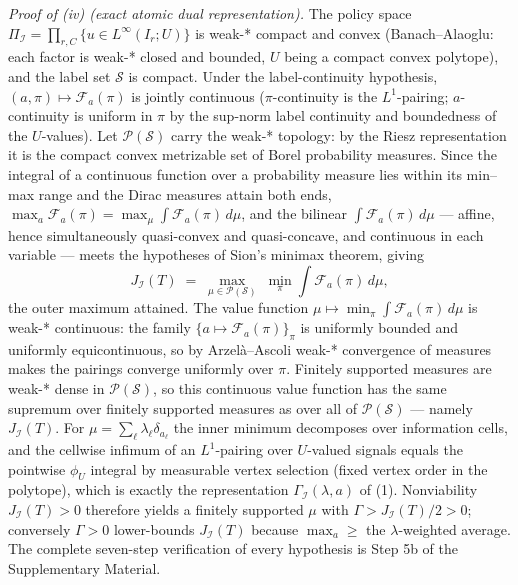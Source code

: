 \documentclass[10pt,twocolumn]{article}
\theoremstyle{plain}
\theoremstyle{definition}
\theoremstyle{remark}
\begin{document}
\emph{Proof of (iv) (exact atomic dual representation).} The policy space
\(\Pi_{\mathcal{I}} = \prod_{r,C}\{u \in L^\infty(I_r; U)\}\) is
weak-* compact and convex (Banach--Alaoglu: each factor is weak-* closed
and bounded, \(U\) being a compact convex polytope), and the label set
\(\mathscr{S}\) is compact. Under the label-continuity hypothesis,
\((a, \pi) \mapsto \mathcal{F}_a(\pi)\) is jointly continuous
(\(\pi\)-continuity is the \(L^1\)-pairing; \(a\)-continuity is
uniform in \(\pi\) by the sup-norm label continuity and boundedness of
the \(U\)-values). Let \(\mathcal{P}(\mathscr{S})\) carry the weak-*
topology: by the Riesz representation it is the compact convex metrizable
set of Borel probability measures. Since the integral of a continuous
function over a probability measure lies within its min--max range and
the Dirac measures attain both ends,
\(\max_a \mathcal{F}_a(\pi) = \max_\mu \int
\mathcal{F}_a(\pi)\,d\mu\), and the bilinear
\(\int \mathcal{F}_a(\pi)\,d\mu\) --- affine, hence simultaneously
quasi-convex and quasi-concave, and continuous in each variable --- meets
the hypotheses of Sion's minimax theorem, giving
\[
J_{\mathcal{I}}(T) \;=\; \max_{\mu \in \mathcal{P}(\mathscr{S})}
\; \min_{\pi} \int \mathcal{F}_a(\pi)\,d\mu,
\]
the outer maximum attained. The value function
\(\mu \mapsto \min_\pi \int \mathcal{F}_a(\pi)\,d\mu\) is weak-*
continuous: the family \(\{a \mapsto \mathcal{F}_a(\pi)\}_{\pi}\)
is uniformly bounded and uniformly equicontinuous, so by
Arzel\`a--Ascoli weak-* convergence of measures makes the pairings
converge uniformly over \(\pi\). Finitely supported measures are weak-*
dense in \(\mathcal{P}(\mathscr{S})\), so this continuous value
function has the same supremum over finitely supported measures as over
all of \(\mathcal{P}(\mathscr{S})\) --- namely \(J_{\mathcal{I}}(T)\).
For \(\mu = \sum_\ell \lambda_\ell \delta_{a_\ell}\) the inner
minimum decomposes over information cells, and the cellwise infimum of an
\(L^1\)-pairing over \(U\)-valued signals equals the pointwise
\(\phi_U\) integral by measurable vertex selection (fixed vertex order
in the polytope), which is exactly the representation
\(\Gamma_{\mathcal{I}}(\lambda, a)\) of (1). Nonviability
\(J_{\mathcal{I}}(T) > 0\) therefore yields a finitely supported
\(\mu\) with \(\Gamma > J_{\mathcal{I}}(T)/2 > 0\); conversely
\(\Gamma > 0\) lower-bounds \(J_{\mathcal{I}}(T)\) because
\(\max_a \ge \) the \(\lambda\)-weighted average. The complete
seven-step verification of every hypothesis is Step 5b of the
Supplementary Material.
\end{document}
